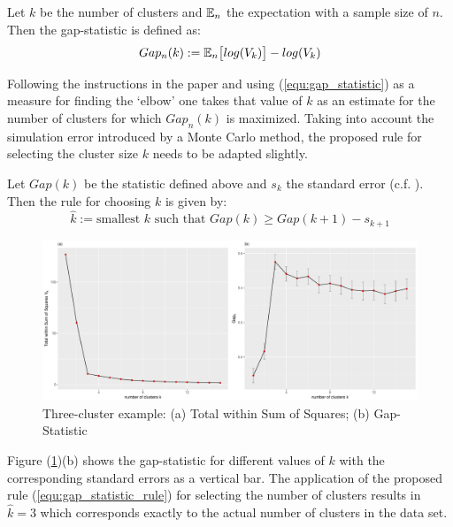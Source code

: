 \begin{definition}
Let $k$ be the number of clusters and $\mathbb{E}_n$  the expectation with a sample size of $n$. Then the gap-statistic is defined as: 
	\begin{equation}\label{equ:gap_statistic}
		Gap_n(k) := \mathbb{E}_n\big[ log(V_k) \big] - log(V_k)
	\end{equation}
\end{definition}

Following the instructions in the paper and using (\ref{equ:gap_statistic}) as a measure for finding the `elbow' one takes that value of $k$ as an estimate for the number of clusters for which $Gap_n(k)$ is maximized. Taking into account the simulation error introduced by a Monte Carlo method, the proposed rule for selecting the cluster size $k$ needs to be adapted slightly. 

\begin{definition} Let $Gap(k)$ be the statistic defined above and $s_k$ the standard error (c.f. \cite{tibshirani2001estimating}). Then the rule for choosing $k$ is given by: 
	\begin{equation}\label{equ:gap_statistic_rule}
	\hat{k} := \text{smallest } k \text{ such that } Gap(k) \geq Gap(k+1) - s_{k+1}
	\end{equation}
\end{definition}

\begin{figure}
	\centering
	\includegraphics[width=\textwidth]{figures/chapter_k_means/gap_withinSS}
	\caption{Three-cluster example: (a) Total within Sum of Squares; (b) Gap-Statistic}
	\label{fig:gap_statistics}
\end{figure}

Figure (\ref{fig:gap_statistics})(b) shows the gap-statistic for different values of $k$ with the corresponding standard errors as a vertical bar. The application of the proposed rule (\ref{equ:gap_statistic_rule}) for selecting the number of clusters results in $\hat{k} = 3$ which corresponds exactly to the actual number of clusters in the data set. 

